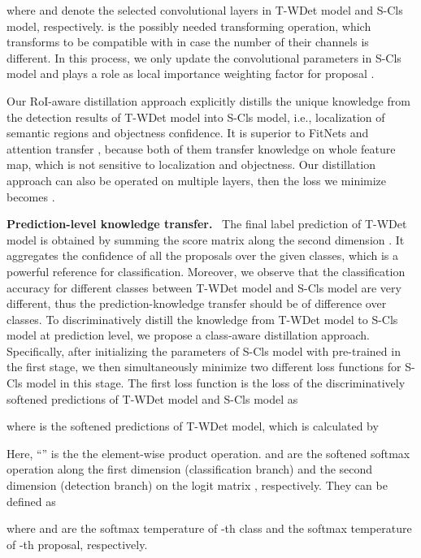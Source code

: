 \documentclass[sigconf,natbib=false]{acmart}
\begin{document}
where  and  denote the selected convolutional layers in T-WDet model and S-Cls model, respectively.  is the possibly needed transforming operation, which transforms  to be compatible with  in case the number of their channels is different. In this process, we only update the convolutional parameters  in S-Cls model and  plays a role as local importance weighting factor for proposal .



Our RoI-aware distillation approach explicitly distills the unique knowledge from the detection results of T-WDet model into S-Cls model, i.e., localization of semantic regions and objectness confidence. It is superior to FitNets \cite{KD2_iclr15_ansacy} and attention transfer \cite{KD3_iclr17_sn}, because both of them transfer knowledge on whole feature map, which is not sensitive to localization and objectness. Our distillation approach can also be operated on multiple layers, then the loss we minimize becomes .

\vspace{+1mm}
\noindent \textbf{Prediction-level knowledge transfer.} \ The final label prediction  of T-WDet model is obtained by summing the score matrix  along the second dimension . It aggregates the confidence of all the proposals over the given classes, which is a powerful reference for classification. Moreover, we observe that the classification accuracy for different classes between T-WDet model and S-Cls model are very different, thus the prediction-knowledge transfer should be of difference over classes. To discriminatively distill the knowledge from T-WDet model to S-Cls model at prediction level, we propose a class-aware distillation approach. Specifically, after initializing the parameters  of S-Cls model with  pre-trained in the first stage, we then simultaneously minimize two different loss functions for S-Cls model in this stage. The first loss function is the  loss of the discriminatively softened predictions of T-WDet model and S-Cls model as

where  is the softened predictions of T-WDet model, which is calculated by

Here,  ``'' is the the element-wise product operation.  and  are the softened softmax operation along the first dimension  (classification branch) and the second dimension  (detection branch) on the logit matrix , respectively. They can be defined as

where  and  are the softmax temperature of -th class and the softmax temperature of -th proposal, respectively.
\end{document}
